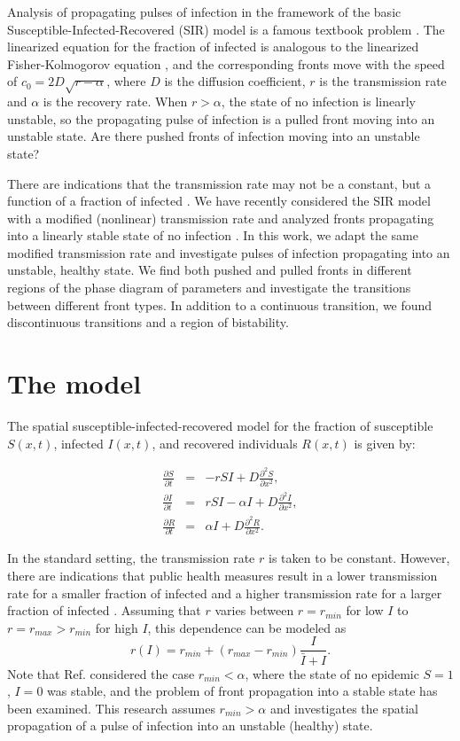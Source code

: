 \documentclass[pre,aps,twocolumn,showpacs]{revtex4}
\begin{document}
Analysis of propagating pulses of infection in the framework of the basic Susceptible-Infected-Recovered (SIR) model is a famous textbook problem \cite{book}. The linearized equation for the fraction of infected is analogous to the linearized Fisher-Kolmogorov equation \cite{FK1,FK2}, and the corresponding fronts move with the speed of $c_0=2D\sqrt{r-\alpha}$, where $D$ is the diffusion coefficient, $r$ is the transmission rate and $\alpha$ is the recovery rate. When $r>\alpha$, the state of no infection is linearly unstable, so the propagating pulse of infection is a pulled front moving into an unstable state. Are there pushed fronts of infection moving into an unstable state?

There are indications that the transmission rate may not be a constant, but a function of a fraction of infected \cite{Allee}. We have recently considered the SIR model with a modified (nonlinear) transmission rate and analyzed fronts propagating into a linearly stable state of no infection \cite{KhainPRE2023}. In this work, we adapt the same modified transmission rate and investigate pulses of infection propagating into an unstable, healthy state. We find both pushed and pulled fronts in different regions of the phase diagram of parameters and investigate the transitions between different front types. In addition to a continuous transition, we found discontinuous transitions and a region of bistability.

\section{The model}

The spatial susceptible-infected-recovered model for the fraction of susceptible $S(x,t)$, infected $I(x,t)$, and recovered individuals $R(x,t)$ \cite{book} is given by:

\begin{eqnarray}
\frac{\partial S}{\partial t} &=& - r S I +  D \frac{\partial^2 S}{\partial x^2}, \\ \nonumber
\frac{\partial I}{\partial t} &=& r S I - \alpha I  +  D \frac{\partial^2 I}{\partial x^2}, \\ \nonumber
\frac{\partial R}{\partial t} &=& \alpha I  +  D \frac{\partial^2 R}{\partial x^2}.
\end{eqnarray}

In the standard setting, the transmission rate $r$ is taken to be constant. However, there are indications that public health measures result in a lower transmission rate for a smaller fraction of infected and a higher transmission rate for a larger fraction of infected \cite{Allee}. Assuming that $r$ varies between $r = r_{min}$ for low $I$ to $r = r_{max}>r_{min}$ for high $I$, this dependence can be modeled as \cite{KhainPRE2023}
$$ r(I) = r_{min} + (r_{max}-r_{min})\frac{I}{\bar{I}+I}. $$ Note that Ref. \cite{KhainPRE2023} considered the case $r_{min} < \alpha$, where the state of no epidemic $S=1$, $I=0$ was stable, and the problem of front propagation into a stable state has been examined. This research assumes $r_{min} > \alpha$ and investigates the spatial propagation of a pulse of infection into an unstable (healthy) state.
\end{document}
